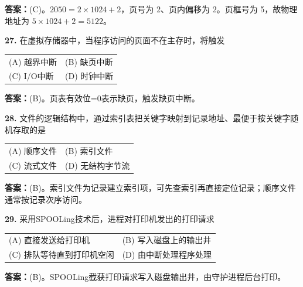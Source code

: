 \ifshowsolutions\par\noindent\textbf{答案：}(C)。$2050=2\times1024+2$，页号为 2、页内偏移为 2。页框号为 5，故物理地址为 $5\times1024+2=5122$。\else \answerarea \fi

\vspace{6pt}

\noindent\textbf{27.} 在虚拟存储器中，当程序访问的页面不在主存时，将触发
\begin{center}
\begin{tabular}{ll}
(A) 越界中断 & (B) 缺页中断 \\[6pt]
(C) I/O中断 & (D) 时钟中断
\end{tabular}
\end{center}

\ifshowsolutions\par\noindent\textbf{答案：}(B)。页表有效位=0表示缺页，触发缺页中断。\else \answerarea \fi

\vspace{6pt}

\noindent\textbf{28.} 文件的逻辑结构中，通过索引表把关键字映射到记录地址、最便于按关键字随机存取的是
\begin{center}
\begin{tabular}{ll}
(A) 顺序文件 & (B) 索引文件 \\[6pt]
(C) 流式文件 & (D) 无结构字节流
\end{tabular}
\end{center}

\ifshowsolutions\par\noindent\textbf{答案：}(B)。索引文件为记录建立索引项，可先查索引再直接定位记录；顺序文件通常按记录次序访问。\else \answerarea \fi

\vspace{6pt}

\noindent\textbf{29.} 采用SPOOLing技术后，进程对打印机发出的打印请求
\begin{center}
\begin{tabular}{ll}
(A) 直接发送给打印机 & (B) 写入磁盘上的输出井 \\[6pt]
(C) 排队等待直到打印机空闲 & (D) 由中断处理程序处理
\end{tabular}
\end{center}

\ifshowsolutions\par\noindent\textbf{答案：}(B)。SPOOLing截获打印请求写入磁盘输出井，由守护进程后台打印。\else \answerarea \fi

\vspace{6pt}

